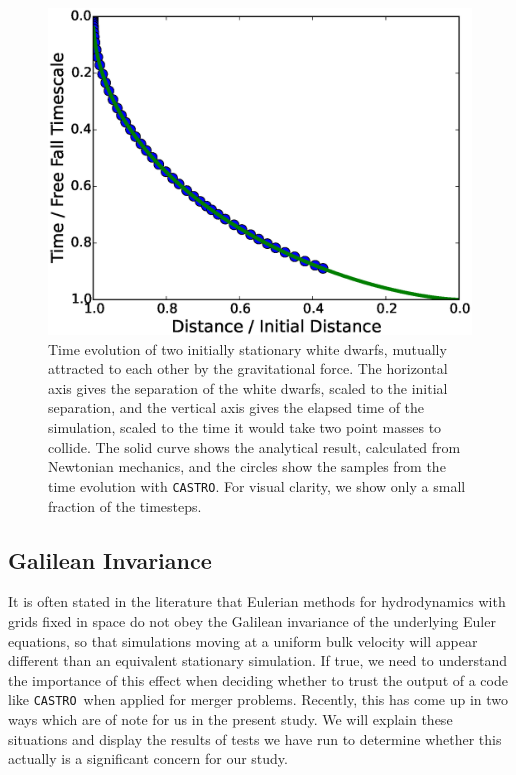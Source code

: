 \documentclass[iop]{../emulateapj}
\newcommand{\castro}{\texttt{CASTRO}}
\begin{document}
\begin{figure}
  \centering
  \includegraphics[scale=0.45]{plots/freefall}
  \caption{Time evolution of two initially stationary white dwarfs,
    mutually attracted to each other by the gravitational force. The
    horizontal axis gives the separation of the white dwarfs, scaled
    to the initial separation, and the vertical axis gives the elapsed
    time of the simulation, scaled to the time it would take two point masses
    to collide. The solid curve shows the analytical result,
    calculated from Newtonian mechanics, and the circles show the
    samples from the time evolution with \castro. For visual clarity, we 
    show only a small fraction of the timesteps.}
  \label{fig:freefall}
\end{figure}

\subsection{Galilean Invariance}\label{sec:galileo}

It is often stated in the literature that Eulerian methods for
hydrodynamics with grids fixed in space do not obey the Galilean
invariance of the underlying Euler equations, so that simulations
moving at a uniform bulk velocity will appear different than an
equivalent stationary simulation. If true, we need to understand 
the importance of this effect when deciding whether to trust the 
output of a code like \castro\ when applied for merger problems.
Recently, this has come up in two ways which are of note for us 
in the present study. We will explain these situations and display 
the results of tests we have run to determine whether this 
actually is a significant concern for our study.
\end{document}
